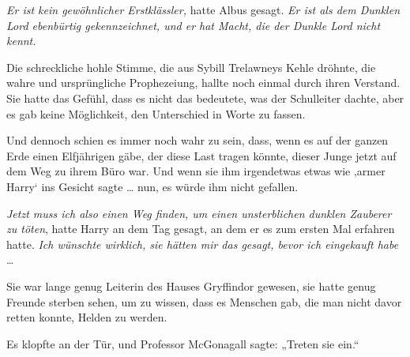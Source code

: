 \emph{Er ist kein gewöhnlicher Erstklässler,} hatte Albus gesagt. \emph{Er ist als dem Dunklen Lord ebenbürtig gekennzeichnet, und er hat Macht, die der Dunkle Lord nicht kennt.}

Die schreckliche hohle Stimme, die aus Sybill Trelawneys Kehle dröhnte, die wahre und ursprüngliche Prophezeiung, hallte noch einmal durch ihren Verstand. Sie hatte das Gefühl, dass es nicht das bedeutete, was der Schulleiter dachte, aber es gab keine Möglichkeit, den Unterschied in Worte zu fassen.

Und dennoch schien es immer noch wahr zu sein, dass, wenn es auf der ganzen Erde einen Elfjährigen gäbe, der diese Last tragen könnte, dieser Junge jetzt auf dem Weg zu ihrem Büro war. Und wenn sie ihm irgendetwas etwas wie ‚armer Harry‘ ins Gesicht sagte … nun, es würde ihm nicht gefallen.

\emph{Jetzt muss ich also einen Weg finden, um einen unsterblichen dunklen Zauberer zu töten}, hatte Harry an dem Tag gesagt, an dem er es zum ersten Mal erfahren hatte. \emph{Ich wünschte wirklich, sie hätten mir das gesagt, bevor ich eingekauft habe} …

Sie war lange genug Leiterin des Hauses Gryffindor gewesen, sie hatte genug Freunde sterben sehen, um zu wissen, dass es Menschen gab, die man nicht davor retten konnte, Helden zu werden.

Es klopfte an der Tür, und Professor McGonagall sagte:
„Treten sie ein.“

